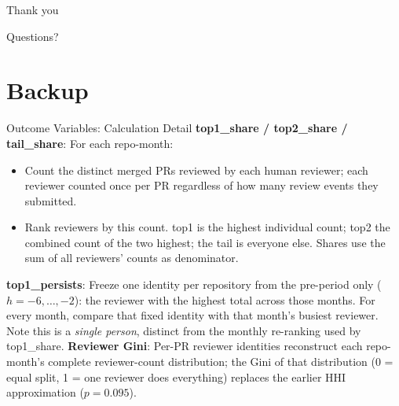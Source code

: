 \begin{frame}[plain]
\begin{center}
\Large Thank you
\vspace{1em}

\normalsize Questions?
\end{center}
\end{frame}

\section{Backup}

\begin{frame}{Outcome Variables: Calculation Detail}
\textbf{top1\_share / top2\_share / tail\_share}: For each repo-month:
\begin{itemize}
  \item Count the distinct merged PRs reviewed by each human reviewer;
        each reviewer counted once per PR regardless of how many review
        events they submitted.
  \item Rank reviewers by this count. top1 is the highest individual
        count; top2 the combined count of the two highest; the tail is
        everyone else. Shares use the sum of all reviewers' counts as
        denominator.
\end{itemize}
\textbf{top1\_persists}: Freeze one identity per repository from the
pre-period only ($h=-6,\dots,-2$): the reviewer with the highest total
across those months. For every month, compare that fixed identity with
that month's busiest reviewer. Note this is a \emph{single person},
distinct from the monthly re-ranking used by top1\_share.
\vspace{0.3em}
\textbf{Reviewer Gini}: Per-PR reviewer identities reconstruct each
repo-month's complete reviewer-count distribution; the Gini of that
distribution (0 = equal split, 1 = one reviewer does everything)
replaces the earlier HHI approximation ($p=0.095$).
\end{frame}

